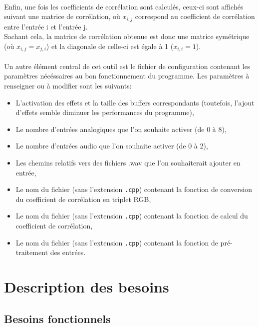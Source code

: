 \documentclass{article}
\begin{document}
\paragraph{}
Enfin, une fois les coefficients de corrélation sont calculés, ceux-ci sont
affichés suivant une matrice de corrélation, où $x_{i,j}$ correspond au
coefficient de corrélation entre l'entrée i et l'entrée j.\\
Sachant cela, la matrice de corrélation obtenue est donc une matrice
symétrique (où $x_{i,j} = x_{j,i}$) et la diagonale de celle-ci est égale à
1 ($x_{i,i} = 1$).
\paragraph{}
Un autre élément central de cet outil est le fichier de configuration
contenant les paramètres nécéssaires au bon fonctionnement du programme. Les
paramètres à renseigner ou à modifier sont les suivants:
\begin{itemize}
	\item L'activation des effets et la taille des buffers correspondants
	      (toutefois, l'ajout d'effets semble diminuer les performances du
	      programme),
	\item Le nombre d'entrées analogiques que l'on souhaite activer (de 0 à 8),
	\item Le nombre d'entrées audio que l'on souhaite activer (de 0 à 2),
	\item Les chemins relatifs vers des fichiers .wav que l'on souhaiterait
	      ajouter en entrée,
	\item Le nom du fichier (sans l'extension \verb!.cpp!) contenant la
	      fonction de conversion du coefficient de corrélation en triplet RGB,
	\item Le nom du fichier (sans l'extension \verb!.cpp!) contenant la
	      fonction de calcul du coefficient de corrélation,
	\item Le nom du fichier (sans l'extension \verb!.cpp!) contenant la
	      fonction de pré-traitement des entrées.
\end{itemize}
\section{Description des besoins}
\subsection{Besoins fonctionnels}
\end{document}
